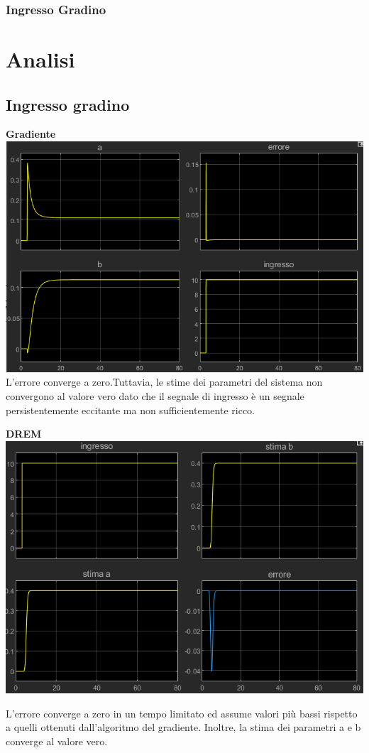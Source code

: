 \documentclass{beamer}
\begin{document}
\begin{frame}
	\frametitle{Ingresso Gradino}
	\section{Analisi}
	\subsection{Ingresso gradino}
		\begin{minipage}[t]{0.42\textwidth}
			\textbf{Gradiente}
		\includegraphics[scale=0.28]{2022-05-09-17-46-10.png}\newline%
		\small
		L'errore converge a zero.Tuttavia, le stime dei parametri del sistema non convergono al valore vero dato che il segnale di ingresso è un segnale persistentemente eccitante ma non sufficientemente ricco.
	\end{minipage}\hspace{1cm}
	\begin{minipage}[t]{0.42\textwidth}
		\textbf{DREM}
		\includegraphics[scale=0.28]{2022-05-09-17-58-17.png} %
		\small

		L'errore converge a zero in un tempo limitato ed assume valori più bassi rispetto a quelli ottenuti dall'algoritmo del gradiente. Inoltre, la stima dei parametri a e b converge al valore vero.
	\end{minipage}
\end{frame}
\end{document}

